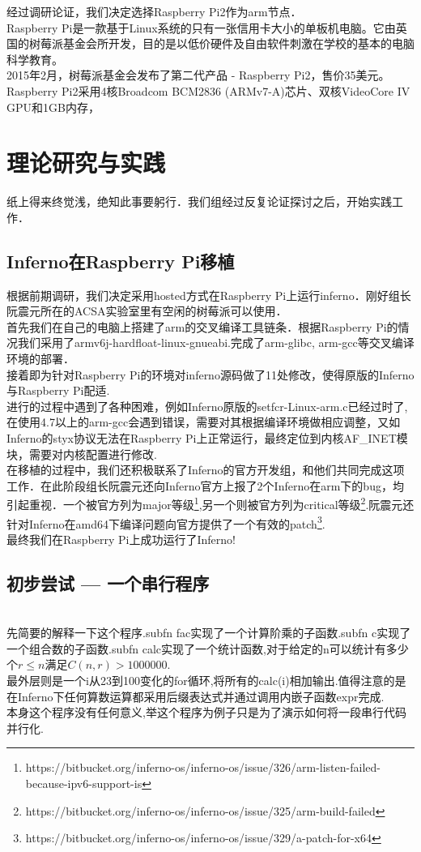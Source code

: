 \documentclass[paper=a4]{ctexart} %
\numberwithin{equation}{section} %
\numberwithin{figure}{section} %
\numberwithin{table}{section} %
\newcommand{\n}{\\\indent}
\begin{document}
经过调研论证，我们决定选择Raspberry Pi2作为arm节点．\n
Raspberry Pi是一款基于Linux系统的只有一张信用卡大小的单板机电脑。它由英国的树莓派基金会所开发，目的是以低价硬件及自由软件刺激在学校的基本的电脑科学教育。\n
2015年2月，树莓派基金会发布了第二代产品 - Raspberry Pi2，售价35美元。Raspberry Pi2采用4核Broadcom BCM2836 (ARMv7-A)芯片、双核VideoCore IV GPU和1GB内存，\n

\section{理论研究与实践}
纸上得来终觉浅，绝知此事要躬行．我们组经过反复论证探讨之后，开始实践工作．

\subsection{Inferno在Raspberry Pi移植}
根据前期调研，我们决定采用hosted方式在Raspberry Pi上运行inferno．刚好组长阮震元所在的ACSA实验室里有空闲的树莓派可以使用．\n
首先我们在自己的电脑上搭建了arm的交叉编译工具链条．根据Raspberry Pi的情况我们采用了armv6j-hardfloat-linux-gnueabi.完成了arm-glibc, arm-gcc等交叉编译环境的部署．　\n
接着即为针对Raspberry Pi的环境对inferno源码做了11处修改，使得原版的Inferno与Raspberry Pi配适. \n
进行的过程中遇到了各种困难，例如Inferno原版的setfcr-Linux-arm.c已经过时了,在使用4.7以上的arm-gcc会遇到错误，需要对其根据编译环境做相应调整，又如Inferno的styx协议无法在Raspberry Pi上正常运行，最终定位到内核AF\_INET模块，需要对内核配置进行修改. \n
 在移植的过程中，我们还积极联系了Inferno的官方开发组，和他们共同完成这项工作．在此阶段组长阮震元还向Inferno官方上报了2个Inferno在arm下的bug，均引起重视．一个被官方列为major等级\footnote{https://bitbucket.org/inferno-os/inferno-os/issue/326/arm-listen-failed-because-ipv6-support-is},另一个则被官方列为critical等级\footnote{https://bitbucket.org/inferno-os/inferno-os/issue/325/arm-build-failed}.阮震元还针对Inferno在amd64下编译问题向官方提供了一个有效的patch\footnote{https://bitbucket.org/inferno-os/inferno-os/issue/329/a-patch-for-x64}.\n
最终我们在Raspberry Pi上成功运行了Inferno!
\subsection{初步尝试 --- 一个串行程序}

~\n
先简要的解释一下这个程序.subfn fac实现了一个计算阶乘的子函数.subfn c实现了一个组合数的子函数.subfn calc实现了一个统计函数,对于给定的n可以统计有多少个$r\leq n$满足$C(n,r) > 1000000$.\n
最外层则是一个i从23到100变化的for循环,将所有的calc(i)相加输出.值得注意的是在Inferno下任何算数运算都采用后缀表达式并通过调用内嵌子函数expr完成.\n
本身这个程序没有任何意义,举这个程序为例子只是为了演示如何将一段串行代码并行化.
\end{document}
